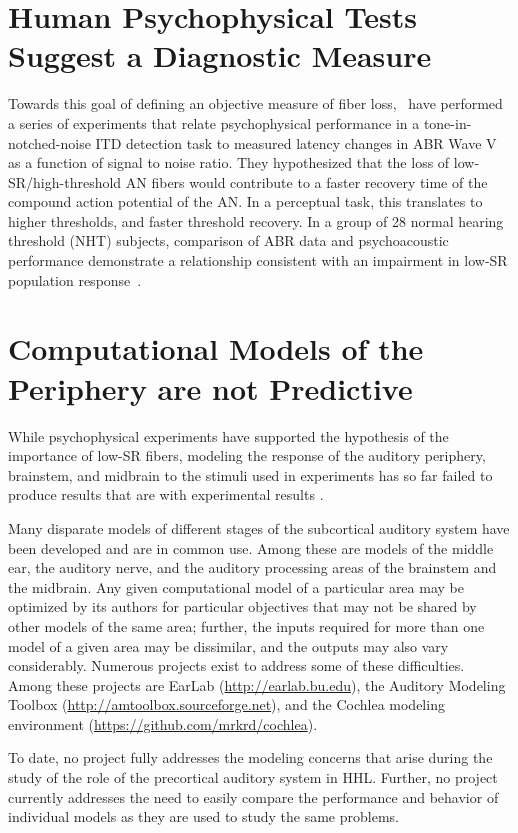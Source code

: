 \section{Human Psychophysical Tests Suggest a Diagnostic Measure}
Towards this goal of defining an objective measure of fiber loss,~\cite{Mehraei2015Individual,Mehraei2016Auditory} have performed a series of experiments that relate psychophysical performance in a tone-in-notched-noise ITD detection task to measured latency changes in ABR Wave V as a function of signal to noise ratio.  They hypothesized that the loss of low-SR/high-threshold AN fibers would contribute to a faster recovery time of the compound action potential of the AN.  In a perceptual task, this translates to higher thresholds, and faster threshold recovery. In a group of 28 normal hearing threshold (NHT) subjects, comparison of ABR data and psychoacoustic performance demonstrate a relationship consistent with an impairment in low-SR population response~\cite{Mehraei2016Auditory}.

\section{Computational Models of the Periphery are not Predictive}

While psychophysical experiments have supported the hypothesis of the importance of low-SR fibers, modeling the response of the auditory periphery, brainstem, and midbrain to the stimuli used in experiments has so far failed to produce results that are with experimental results \citep{Mehraei2016Auditory}.

Many disparate models of different stages of the subcortical auditory system have been developed and are in common use.  Among these are models of the middle ear, the auditory nerve, and the auditory processing areas of the brainstem and the midbrain.  Any given computational model of a particular area may be optimized by its authors for particular objectives that may not be shared by other models of the same area; further, the inputs required for more than one model of a given area may be dissimilar, and the outputs may also vary considerably.    Numerous projects exist to address some of these difficulties.  Among these projects are EarLab (\url{http://earlab.bu.edu}), the Auditory Modeling Toolbox (\url{http://amtoolbox.sourceforge.net}), and the Cochlea modeling environment (\url{https://github.com/mrkrd/cochlea})\cite{Rudnicki2014Cochlea}.   

To date, no project fully addresses the modeling concerns that arise during the study of the role of the precortical auditory system in HHL.   Further, no project currently addresses the need to easily compare the performance and behavior of individual models as they are used to study the same problems.

